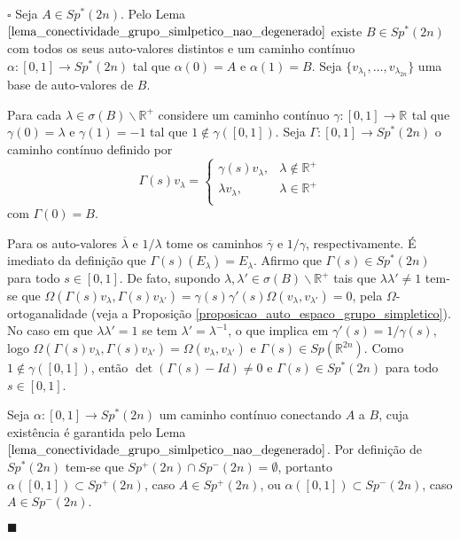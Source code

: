 \documentclass[12pt]{book}
\newenvironment{prova}[1]{$\square$ #1}{\hfill$\blacksquare$}
\newcommand{\complementar}[2]{#1 \backslash #2}
\newcommand{\espectrooperador}[1]{\sigma(#1)}
\newcommand{\formaSimpleticaExtendida}[2]{\Omega(#1, #2)}
\newcommand{\funcaocond}[5]{
	#1 = 
	\left\{
	\begin{array}{cc}
		#2, & #3\\
		#4, & #5\\
	\end{array}
	\right.
}
\newcommand{\gruposimpletico}[1]{Sp(#1)}
\newcommand{\gruposimpleticonaodegenerado}[1]{Sp^{#1}(2n)}
\newcommand{\intervalo}{[0,1]}
\newcommand{\real}[1]{\mathbb{R}^{#1}}
\newcommand{\reta}{\real{}}
\begin{document}
\begin{prova}
		Seja $A \in \gruposimpleticonaodegenerado{*}$. Pelo Lema $\ref{lema_conectividade_grupo_simlpetico_nao_degenerado}$ existe $B \in \gruposimpleticonaodegenerado{*}$ com todos os seus auto-valores distintos  e um caminho contínuo $\alpha:[0,1] \to \gruposimpleticonaodegenerado{*}$ tal que $\alpha(0)=A$ e $\alpha(1) = B$. Seja $\{v_{\lambda_{1}}, \dots , v_{\lambda_{2n}} \}$ uma base de auto-valores de $B$.
		
		Para cada $\lambda \in \complementar{\espectrooperador{B}}{\real{+}}$ considere um caminho contínuo $\gamma:[0,1]\to \reta$ tal que $\gamma(0) = \lambda$ e $\gamma(1) = -1$ tal que $1 \notin \gamma([0,1])$. Seja $\Gamma:[0,1 ]\to \gruposimpleticonaodegenerado{*}$ o caminho contínuo definido por
		$$
		\funcaocond{\Gamma(s)v_{\lambda}}{\gamma(s)v_{\lambda}}{\lambda \notin \real{+}}{\lambda v_{\lambda} }{\lambda \in \real{+}}
		$$
		com $\Gamma(0) = B$. 
		
		Para os auto-valores $\overline{\lambda}$ e $1/\lambda$ tome os caminhos $\overline{\gamma}$ e $1/\gamma$, respectivamente. É imediato da definição que $\Gamma(s)(E_{\lambda}) = E_{\lambda}$. Afirmo que $\Gamma(s) \in \gruposimpleticonaodegenerado{*}$ para todo $s\in \intervalo$. De fato, supondo $\lambda,\lambda' \in \complementar{\sigma(B)}{\real{+}}$ tais que $\lambda\lambda' \neq 1$ tem-se que $\formaSimpleticaExtendida{\Gamma(s)v_{\lambda}}{\Gamma(s)v_{\lambda'}}= \gamma(s)\gamma'(s)\formaSimpleticaExtendida{v_{\lambda}}{v_{\lambda'}} = 0$, pela $\Omega$-ortoganalidade (veja a Proposição \ref{proposicao_auto_espaco_grupo_simpletico}). No caso em que $\lambda\lambda'=1$ se tem  $\lambda'=\lambda^{-1}$, o que implica em $\gamma'(s) = 1/\gamma(s)$, logo $\Omega(\Gamma(s)v_{\lambda},\Gamma(s)v_{\lambda'}) = \Omega(v_{\lambda},v_{\lambda'})$ e $\Gamma(s) \in \gruposimpletico{\real{2n}}$. Como $1 \notin \gamma(\intervalo)$, então $\det(\Gamma(s)- Id)\neq 0 $ e $\Gamma(s)\in \gruposimpleticonaodegenerado{*}$ para todo $s\in \intervalo$.
		
		Seja $\alpha:\intervalo\to \gruposimpleticonaodegenerado{*}$ um caminho contínuo conectando $A$ a $B$, cuja existência é garantida pelo Lema $\ref{lema_conectividade_grupo_simlpetico_nao_degenerado}$.
		Por definição de $\gruposimpleticonaodegenerado{*}$ tem-se que $\gruposimpleticonaodegenerado{+} \cap \gruposimpleticonaodegenerado{-}=\emptyset$, portanto $\alpha([0,1]) \subset \gruposimpleticonaodegenerado{+}$, caso $A \in \gruposimpleticonaodegenerado{+}$, ou $\alpha([0,1]) \subset \gruposimpleticonaodegenerado{-}$, caso $A\in \gruposimpleticonaodegenerado{-}$.
		

\end{prova}
\end{document}
